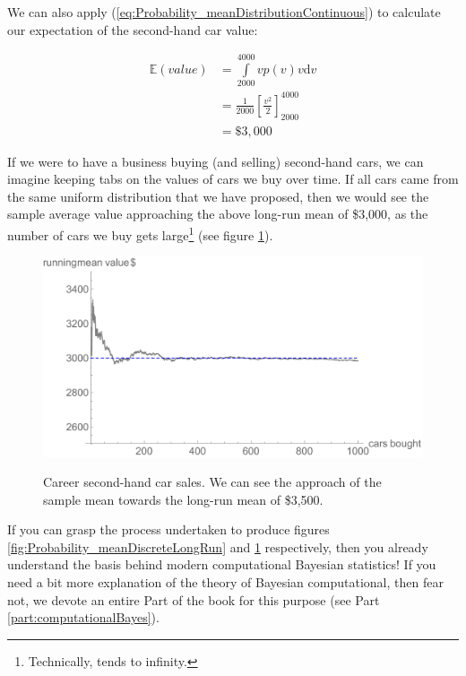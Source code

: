 \documentclass[11pt,fullpage]{book}
\begin{document}
We can also apply (\ref{eq:Probability_meanDistributionContinuous}) to calculate our expectation of the second-hand car value:

\begin{equation}\label{eq:Probability_meanCoinContinuous}
\begin{align}
\mathbb{E}(value) &= \int\limits_{2000}^{4000} v p(v)v\mathrm{d}v\\
&= \frac{1}{2000}\left[\frac{v^2}{2}\right]^{4000}_{2000}\\ 
&= \$3,000
\end{align}
\end{equation}

If we were to have a business buying (and selling) second-hand cars, we can imagine keeping tabs on the values of cars we buy over time. If all cars came from the same uniform distribution that we have proposed, then we would see the sample average value approaching the above long-run mean of \$3,000, as the number of cars we buy gets large\footnote{Technically, tends to infinity.} (see figure \ref{fig:Probability_meanContinuousLongRun}).

\begin{figure}
\centering
\scalebox{0.55} 
{\includegraphics{Probability_meanContinuousLongRun.pdf}}
\caption{Career second-hand car sales. We can see the approach of the sample mean towards the long-run mean of \$3,500.}\label{fig:Probability_meanContinuousLongRun}
\end{figure}

If you can grasp the process undertaken to produce figures \ref{fig:Probability_meanDiscreteLongRun} and \ref{fig:Probability_meanContinuousLongRun} respectively, then you already understand the basis behind modern computational Bayesian statistics! If you need a bit more explanation of the theory of Bayesian computational, then fear not, we devote an entire Part of the book for this purpose (see Part \ref{part:computationalBayes}).  
\end{document}
